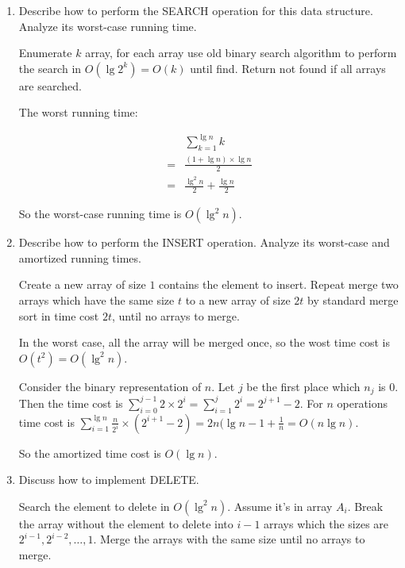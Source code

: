 \documentclass[paper=a4, fontsize=11pt]{scrartcl} %
\begin{document}
\begin{enumerate}
\item
  \begin{fancyquotes}
    Describe how to perform the \textsc{SEARCH} operation for this data
    structure. Analyze its worst-case running time.
  \end{fancyquotes}

  Enumerate $k$ array, for each array use old binary search algorithm
  to perform the search in $O(\lg{2^k})=O(k)$ until find. Return not found
  if all arrays are searched.

  The worst running time:

  \begin{equation}
    \begin{split}
      & \sum_{k=1}^{\lg{n}}{k}\\
      =& \frac{(1+\lg{n})\times\lg{n}}{2}\\
      =& \frac{\lg^2{n}}{2} + \frac{\lg{n}}{2}
    \end{split}
  \end{equation}

  So the worst-case running time is $O(\lg^2{n})$.

\item
  \begin{fancyquotes}
    Describe how to perform the \textsc{INSERT} operation. Analyze its
    worst-case and amortized running times.
  \end{fancyquotes}

  Create a new array of size $1$ contains the element to insert.
  Repeat merge two arrays which have the same size $t$ to a new array
  of size $2t$ by standard merge sort in time cost $2t$, until no
  arrays to merge.

  In the worst case, all the array will be merged once, so the wost
  time cost is $O(t^2)=O(\lg^2{n})$.

  Consider the binary representation of $n$.
  Let $j$ be the first place which $n_j$ is $0$.
  Then the time cost is $\sum_{i=0}^{j-1}{2\times 2^i} =
  \sum_{i=1}^{j}{2^i} = 2^{j+1}-2$.
  For $n$ operations time cost is
  $\sum_{i=1}^{\lg{n}}{\frac{n}{2^i}\times (2^{i+1}-2)} =
  2n(\lg{n}-1+\frac{1}{n} = O(n\lg{n})$.

  So the amortized time cost is $O(\lg{n})$.

\item
  \begin{fancyquotes}
    Discuss how to implement \textsc{DELETE}.
  \end{fancyquotes}

  Search the element to delete in $O(\lg^2{n})$.
  Assume it's in array $A_i$.
  Break the array without the element to delete into $i-1$ arrays
  which the sizes are $2^{i-1}, 2^{i-2}, \ldots, 1$.
  Merge the arrays with the same size until no arrays to merge.

\end{enumerate}

\pagebreak
\end{document}

